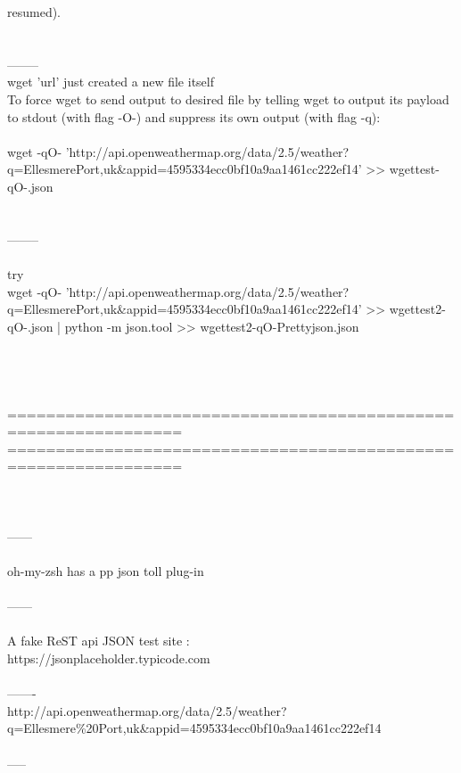 \documentclass[10pt,a4paper]{article}
\begin{document}
{{{{{{{{{    resumed).\\
\\
\\
--------\\
wget 'url' just created a new file itself \\
To force wget to send output to desired file by telling wget to output its payload to stdout (with flag -O-) and suppress its own output (with flag -q):\\
\\
wget -qO- 'http://api.openweathermap.org/data/2.5/weather?q=Ellesmere}{\large  Port,uk\&appid=4595334ecc0bf10a9aa1461cc222ef14' >> wgettest-qO-.json \\
\\
\\
--------\\
\\
try\\
wget -qO- 'http://api.openweathermap.org/data/2.5/weather?q=Ellesmere}{\large  Port,uk\&appid=4595334ecc0bf10a9aa1461cc222ef14' >> wgettest2-qO-.json | python -m json.tool >> wgettest2-qO-Prettyjson.json\\
\\
\\
\\
\\
================================================================\\
================================================================\\
\\
\\
\\
------\\
\\
oh-my-zsh has a pp json toll plug-in\\
\\
------\\
\\
A fake ReST api JSON test site :\\
https://jsonplaceholder.typicode.com}{\large \\
\\
-------\\
http://api.openweathermap.org/data/2.5/weather?q=Ellesmere\%20Port,uk\&appid=4595334ecc0bf10a9aa1461cc222ef14}{\large \\
\\
-----\\
\\
\\
\\
}}}}}}}}}
\end{document}
